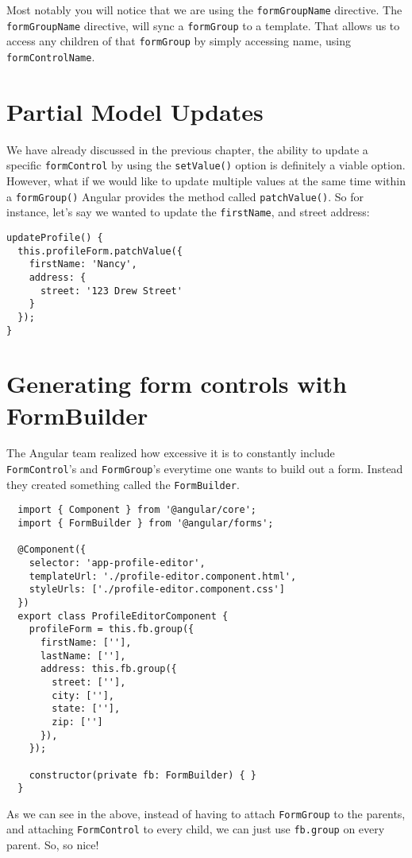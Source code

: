 Most notably you will notice that we are using the \lstinline{formGroupName}
directive. The \lstinline{formGroupName} directive, will sync a 
\lstinline{formGroup} to a template. That allows us to access any children of
that \lstinline{formGroup} by simply accessing name, using \lstinline{formControlName}. 

\section{ Partial Model Updates }
We have already discussed in the previous chapter, the ability to update a 
specific \lstinline{formControl} by using the \lstinline{setValue()} option is 
definitely a viable option. However, what if we would like to update multiple 
values at the same time within a \lstinline{formGroup()} Angular provides the 
method called \lstinline{patchValue()}. So for instance, let's say we wanted
to update the \lstinline{firstName}, and street address: 
\begin{lstlisting}
updateProfile() {
  this.profileForm.patchValue({
    firstName: 'Nancy',
    address: {
      street: '123 Drew Street'
    }
  });
}
\end{lstlisting}

\section{ Generating form controls with FormBuilder }
The Angular team realized how excessive it is to constantly include \lstinline{FormControl}'s
and \lstinline{FormGroup}'s everytime one wants to build out a form. Instead
they created something called the \lstinline{FormBuilder}. 
\begin{lstlisting}
  import { Component } from '@angular/core';
  import { FormBuilder } from '@angular/forms';
  
  @Component({
    selector: 'app-profile-editor',
    templateUrl: './profile-editor.component.html',
    styleUrls: ['./profile-editor.component.css']
  })
  export class ProfileEditorComponent {
    profileForm = this.fb.group({
      firstName: [''],
      lastName: [''],
      address: this.fb.group({
        street: [''],
        city: [''],
        state: [''],
        zip: ['']
      }),
    });
  
    constructor(private fb: FormBuilder) { }
  }  
\end{lstlisting}

As we can see in the above, instead of having to attach \lstinline{FormGroup} to the
parents, and attaching \lstinline{FormControl} to every child, we can just use 
\lstinline{fb.group} on every parent. So, so nice!
